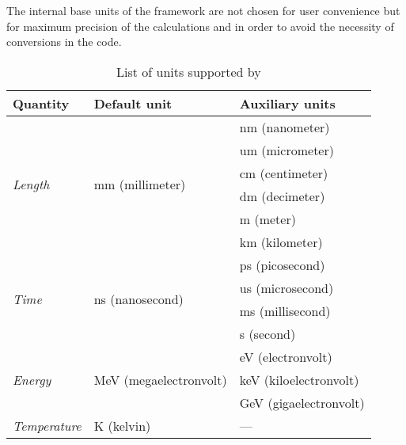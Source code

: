 The internal base units of the framework are not chosen for user convenience but for maximum precision of the calculations and in order to avoid the necessity of conversions in the code.

\begin{table}[tbp]
\caption{List of units supported by \apsq}
\label{tab:units}
\centering
\begin{tabular}{lll}
  \toprule
\textbf{Quantity}                 & \textbf{Default unit}                   & \textbf{Auxiliary units} \\
 \midrule
\multirow{6}{*}{\textit{Length}}  & \multirow{6}{*}{mm (millimeter)}        & nm (nanometer)           \\
                                  &                                         & um (micrometer)          \\
                                  &                                         & cm (centimeter)          \\
                                  &                                         & dm (decimeter)           \\
                                  &                                         & m (meter)                \\
                                  &                                         & km (kilometer)           \\
 \midrule
\multirow{4}{*}{\textit{Time}}    & \multirow{4}{*}{ns (nanosecond)}        & ps (picosecond)          \\
                                  &                                         & us (microsecond)         \\
                                  &                                         & ms (millisecond)         \\
                                  &                                         & s (second)               \\
\midrule
\multirow{3}{*}{\textit{Energy}}  & \multirow{3}{*}{MeV (megaelectronvolt)} & eV (electronvolt)        \\
                                  &                                         & keV (kiloelectronvolt)   \\
                                  &                                         & GeV (gigaelectronvolt)   \\
\midrule
\textit{Temperature}              & K (kelvin)                              & ---                      \\

\end{tabular}
\end{table}

